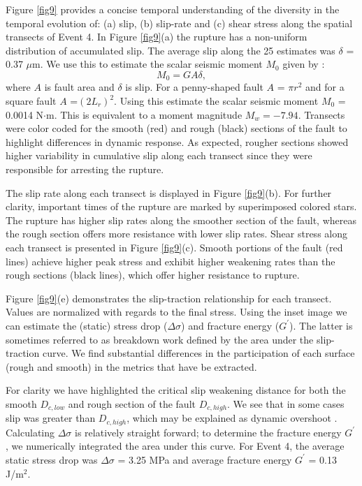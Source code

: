 \documentclass[preprint,1p, 10pt,authoryear]{elsarticle}
\begin{document}
Figure \ref{fig9} provides a concise temporal understanding of the diversity in the temporal evolution of: (a) slip, (b) slip-rate and (c) shear stress along the spatial transects of Event 4. In Figure \ref{fig9}(a) the rupture has a non-uniform distribution of accumulated slip. The average slip along the 25 estimates was $\delta$ = 0.37 $\mu$m.  We use this to estimate the scalar seismic moment $M_{0}$ given by \citet{Aki1966}: 
\begin{equation}
M_{0} = G A \delta, 
\label{eq9}
\end{equation}
\noindent where $A$ is fault area and $\delta$ is slip. For a penny-shaped fault $A$ = $\pi r^{2}$ and for a square fault $A$ =$(2L_{r})^{2}$. Using this estimate the scalar seismic moment $M_{0}$ = 0.0014 N$\cdot$m. This is equivalent to a moment magnitude $M_{w} = -7.94$.  Transects were color coded for the smooth (red) and rough (black) sections of the fault to highlight differences in dynamic response. As expected, rougher sections showed higher variability in cumulative slip along each transect since they were responsible for arresting the rupture.    

The slip rate along each transect is displayed in Figure \ref{fig9}(b). For further clarity, important times of the rupture are marked by superimposed colored stars. The rupture has higher slip rates along the smoother section of the fault, whereas the rough section offers more resistance with lower slip rates. Shear stress along each transect is presented in Figure \ref{fig9}(c). Smooth portions of the fault (red lines) achieve higher peak stress and exhibit higher weakening rates than the rough sections (black lines), which offer higher resistance to rupture.

Figure \ref{fig9}(e) demonstrates the slip-traction relationship for each transect. Values are normalized with regards to the final stress. Using the inset image we can estimate the (static) stress drop ($\Delta\sigma$) and fracture energy ($G^{'}$).  The latter is sometimes referred to as breakdown work defined by the area under the slip-traction curve\citep[e.g.,][]{Tinti2005, Cocco2016}. We find substantial differences in the participation of each surface (rough and smooth) in the metrics that have be extracted. 

For clarity we have highlighted the critical slip weakening distance for both the smooth $D_{c,low}$ and rough section of the fault $D_{c, high}$. We see that in some cases slip was greater than $D_{c, high}$, which may be explained as dynamic overshoot \citep{Madariaga1976}. Calculating $\Delta \sigma$ is relatively straight forward; to determine the fracture energy $G^{'}$, we numerically integrated the area under this curve. For Event 4, the average static stress drop was $\Delta\sigma$ = 3.25 MPa and average fracture energy $G^{'}$ = 0.13 J/m$^{2}$.  
\end{document}
